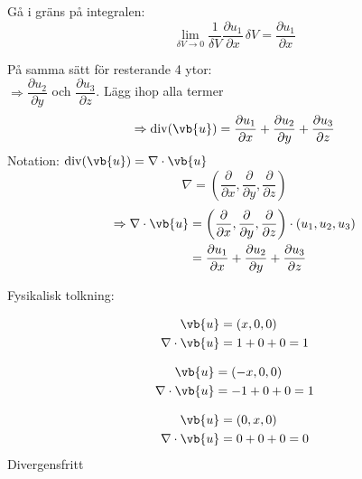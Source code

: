 Gå i gräns på integralen:
\[ \lim_{\delta V \to 0} \frac{1}{\delta V} \frac{\partial u_1}{\partial x}\,\delta V = \frac{\partial u_1}{\partial x} \]

På samma sätt för resterande 4 ytor:\\
$\Rightarrow \dfrac{\partial u_2}{\partial y}$ och $\dfrac{\partial u_3}{\partial z}$. Lägg ihop alla termer
\[ \Rightarrow \operatorname{div}(\vb{u}) = \frac{\partial u_1}{\partial x} + \frac{\partial u_2}{\partial y} + \frac{\partial u_3}{\partial z} \]
Notation: $\operatorname{div}(\vb{u}) = \nabla \cdot \vb{u}$
\[ \nabla = \left( \frac{\partial}{\partial x}, \frac{\partial}{\partial y}, \frac{\partial}{\partial z} \right) \]
\begin{align*}
\Rightarrow \nabla \cdot \vb{u} &= \left( \frac{\partial}{\partial x}, \frac{\partial}{\partial y}, \frac{\partial}{\partial z} \right) \cdot (u_1, u_2, u_3) \\
&= \frac{\partial u_1}{\partial x} + \frac{\partial u_2}{\partial y} + \frac{\partial u_3}{\partial z}
\end{align*}

Fysikalisk tolkning:

\begin{minipage}{0.3\linewidth}
\end{minipage}
\begin{minipage}{0.68\linewidth}
\begin{align*}
\vb{u} &= (x, 0, 0) \\
\nabla \cdot \vb{u} &= 1 + 0 + 0 = 1
\end{align*}
\end{minipage}

\begin{minipage}{0.3\linewidth}
\end{minipage}
\begin{minipage}{0.68\linewidth}
\begin{align*}
\vb{u} &= (-x, 0, 0) \\
\nabla \cdot \vb{u} &= -1 + 0 + 0 = 1
\end{align*}
\end{minipage}

\begin{minipage}{0.3\linewidth}
\end{minipage}
\begin{minipage}{0.68\linewidth}
\begin{align*}
\vb{u} &= (0, x, 0) \\
\nabla \cdot \vb{u} &= 0 + 0 + 0 = 0
\end{align*}
Divergensfritt
\end{minipage}
